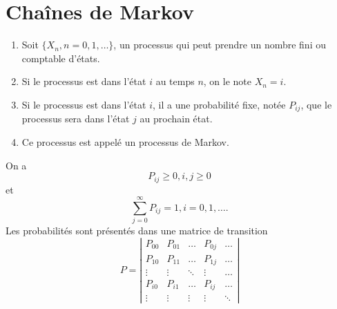 \chapter{Chaînes de Markov}

\begin{enumerate}
	\item Soit $\{X_n, n = 0, 1, \dots\}$, un processus qui peut prendre un nombre fini ou comptable d'états. 
	\item Si le processus est dans l'état $i$ au temps $n$, on le note $X_n = i$. 
	\item Si le processus est dans l'état $i$, il a une probabilité fixe, notée $P_{ij}$, que le processus sera dans l'état $j$ au prochain état. 
	\item Ce processus est appelé un processus de Markov. 
\end{enumerate}

On a $$P_{ij} \geq 0, i, j \geq 0$$
et
$$\sum_{j =0 }^{\infty} P_{ij} = 1, i = 0, 1, \dots .$$
Les probabilités sont présentés dans une matrice de transition
$$P = \left|\begin{array}{ccccc}
	P_{00} & P_{01} & \dots & P_{0j} & \dots \\
	P_{10} & P_{11} & \dots & P_{1j} & \dots \\
	\vdots & \vdots & \ddots & \vdots & \dots \\
	P_{i0} & P_{i1} & \dots & P_{ij} & \dots \\
	\vdots & \vdots & \vdots & \vdots & \ddots 
\end{array}\right|
$$



